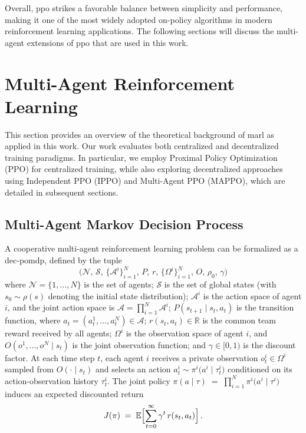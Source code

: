 Overall, \gls{ppo} strikes a favorable balance between simplicity and performance, making it one of the most widely adopted on-policy algorithms in modern reinforcement learning applications. The following sections will discuss the multi-agent extensions of \gls{ppo} that are used in this work.
\section{Multi-Agent Reinforcement Learning}
This section provides an overview of the theoretical background of \gls{marl} as applied in this work. Our work evaluates both centralized and decentralized training paradigms. In particular, we employ Proximal Policy Optimization (PPO) for centralized training, while also exploring decentralized approaches using Independent PPO (IPPO) and Multi-Agent PPO (MAPPO), which are detailed in subsequent sections.
\subsection{Multi-Agent Markov Decision Process}
A cooperative multi-agent reinforcement learning problem can be formalized as a \gls{dec-pomdp}\cite{oliehoek_concise_2016}, defined by the tuple
\begin{equation}
  \bigl(\mathcal{N},\,\mathcal{S},\,\{\mathcal{A}^i\}_{i=1}^N,\,P,\,r,\,\{\Omega^i\}_{i=1}^N,\,O,\,\rho_0,\,\gamma\bigr)
\end{equation}
where $\mathcal{N}=\{1,\dots,N\}$ is the set of agents; $\mathcal{S}$ is the set of global states (with $s_0\sim\rho(s)$ denoting the initial state distribution); $\mathcal{A}^i$ is the action space of agent $i$, and the joint action space is $\mathcal{A} = \prod_{i=1}^N \mathcal{A}^i$; $P(s_{t+1} \mid s_t, a_t)$ is the transition function, where $a_t=(a^1_t,\dots,a^N_t)\in\mathcal{A}$; $r(s_t,a_t)\in\mathbb{R}$ is the common team reward received by all agents; $\Omega^i$ is the observation space of agent $i$, and $O(o^1,\dots,o^N\mid s_t)$ is the joint observation function; and $\gamma\in[0,1)$ is the discount factor.
At each time step $t$, each agent $i$ receives a private observation $o^i_t \in \Omega^i$ sampled from $O(\cdot\mid s_t)$ and selects an action 
$a^i_t \sim \pi^i\bigl(a^i \mid \tau^i_t\bigr)$
conditioned on its action-observation history $\tau^i_t$. The joint policy 
$\pi(a\mid \tau) \;=\; \prod_{i=1}^N \pi^i\bigl(a^i\mid \tau^i\bigr)$
induces an expected discounted return
\begin{equation}
  J(\pi) \;=\; \mathbb{E}\Bigl[\sum_{t=0}^\infty \gamma^t\,r(s_t, a_t)\Bigr]\,. 
\end{equation}


